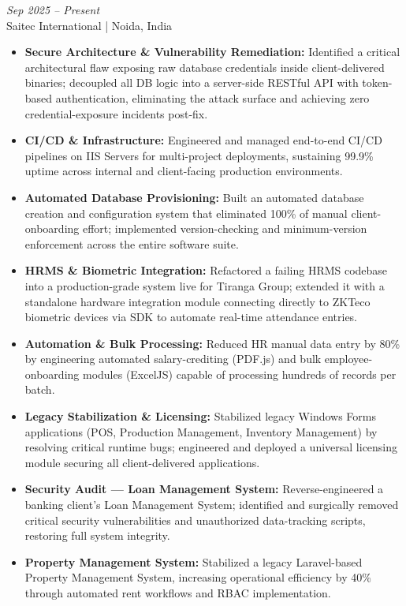 \documentclass[10pt, letterpaper]{article}
\newcommand{\resumeRole}[3]{%
  \vspace{4pt}%
  \noindent{\textbf{\color{darktext}#1}}%
  \hfill%
  {\small\textit{\color{graytext}#3}}\\
  {\small\color{graytext}#2}%
  \vspace{1pt}%
}
\begin{document}
\resumeRole
  {Software Developer Intern}
  {Saitec International | Noida, India}
  {Sep 2025 -- Present}
\begin{itemize}
  \item \textbf{Secure Architecture \& Vulnerability Remediation:} Identified a critical architectural flaw exposing raw database credentials inside client-delivered binaries; decoupled all DB logic into a server-side RESTful API with token-based authentication, eliminating the attack surface and achieving zero credential-exposure incidents post-fix.
  \item \textbf{CI/CD \& Infrastructure:} Engineered and managed end-to-end CI/CD pipelines on IIS Servers for multi-project deployments, sustaining 99.9\% uptime across internal and client-facing production environments.
  \item \textbf{Automated Database Provisioning:} Built an automated database creation and configuration system that eliminated 100\% of manual client-onboarding effort; implemented version-checking and minimum-version enforcement across the entire software suite.
  \item \textbf{HRMS \& Biometric Integration:} Refactored a failing HRMS codebase into a production-grade system live for Tiranga Group; extended it with a standalone hardware integration module connecting directly to ZKTeco biometric devices via SDK to automate real-time attendance entries.
  \item \textbf{Automation \& Bulk Processing:} Reduced HR manual data entry by 80\% by engineering automated salary-crediting (PDF.js) and bulk employee-onboarding modules (ExcelJS) capable of processing hundreds of records per batch.
  \item \textbf{Legacy Stabilization \& Licensing:} Stabilized legacy Windows Forms applications (POS, Production Management, Inventory Management) by resolving critical runtime bugs; engineered and deployed a universal licensing module securing all client-delivered applications.
  \item \textbf{Security Audit --- Loan Management System:} Reverse-engineered a banking client's Loan Management System; identified and surgically removed critical security vulnerabilities and unauthorized data-tracking scripts, restoring full system integrity.
  \item \textbf{Property Management System:} Stabilized a legacy Laravel-based Property Management System, increasing operational efficiency by 40\% through automated rent workflows and RBAC implementation.
\end{itemize}
\end{document}

